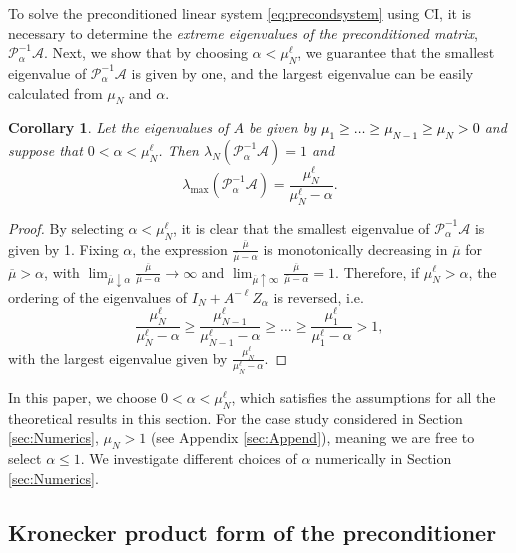 \documentclass{article}
\newtheorem{cor}{Corollary}
\newcommand{\umax}{\mu_{1}}
\newcommand{\umin}{\mu_{\sizeA}}
\newcommand{\aw}{\textcolor{black}}%
\newcommand{\sizeA}{N}
\theoremstyle{definition}
\begin{document}
	{To solve the preconditioned linear system \eqref{eq:precondsystem} using CI, it is necessary to determine the \textit{extreme eigenvalues of the preconditioned matrix}, $\mathcal{P}_{\alpha}^{-1} \mathcal{A}$. Next, we show that by choosing $\alpha<\mu_N^\ell$, we guarantee that the smallest eigenvalue of $\mathcal{P}_{\alpha}^{-1} \mathcal{A}$ is given by one, and the largest eigenvalue can be easily calculated from $\mu_N$ and $\alpha$.} 
	
	\begin{cor}\label{cor:extremeevals}
		Let the eigenvalues of $A$ be given by \aw{$\mu_{1} \ge \ldots \ge \mu_{\sizeA-1} \ge \mu_\sizeA > 0$} and suppose that $0 < \alpha < \mu_{\sizeA}^\ell$. {Then $\lambda_{\sizeA}(\mathcal{P}_{\alpha}^{-1} \mathcal{A}) = 1 $ and
			$$\lambda_{\max}(\mathcal{P}_{\alpha}^{-1} \mathcal{A}) = \frac{\mu_{\sizeA}^\ell}{\mu_{\sizeA}^\ell-\alpha}.
			$$
		}
	\end{cor}
	\begin{proof}
		{By selecting $\alpha < \umin^\ell$, it is clear that the smallest eigenvalue of 
			$\mathcal{P}_{\alpha}^{-1} \mathcal{A}$ is given by 1.}
		Fixing $\alpha $, the expression $\frac{\overline{\mu}}{\overline{\mu}-\alpha }$ is monotonically decreasing in $\overline{\mu}$ for $\overline{\mu}>\alpha$, with $\lim_{\overline{\mu}\downarrow \alpha} \frac{\overline{\mu}}{\overline{\mu}-\alpha}\rightarrow \infty$ and $\lim_{\overline{\mu} \uparrow \infty} \frac{\overline{\mu}}{\overline{\mu}-\alpha} = 1$. Therefore, if  $\mu^\ell_{\sizeA}>\alpha$, 
		the ordering of the  eigenvalues of 
		$I_N + A^{-\ell}Z_\alpha$ is reversed, i.e.
		$$\frac{\umin^\ell}{\umin^\ell-\alpha}\ge \frac{\mu_{\sizeA-1}^\ell}{\mu_{\sizeA -1}^\ell-\alpha}\ge \ldots \ge \frac{\umax^\ell}{\umax^\ell-\alpha}>1,$$
		with 
		the largest eigenvalue given by $\frac{\umin^\ell}
		{{\umin^\ell}-\alpha}.$
	\end{proof}
	In this paper, we choose $0 < \alpha < \umin^\ell$, which satisfies the assumptions for all the theoretical results in this section. For the case study considered in Section \ref{sec:Numerics}, $\umin>1$ (see Appendix \ref{sec:Append}), meaning we are free to select $\alpha \le 1$.  We investigate different choices of $\alpha$ numerically in Section \ref{sec:Numerics}. 
	
	
	
	\subsection{Kronecker product form of the preconditioner}\label{sec:Kroneckerproductform}
	
\end{document}
